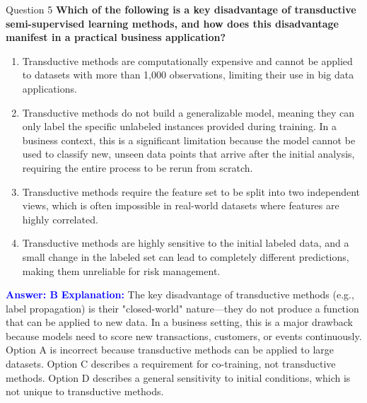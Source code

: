 \documentclass{beamer}
\begin{document}
	\begin{frame}{Question 5}
		\textbf{Which of the following is a key disadvantage of transductive semi-supervised learning methods, and how does this disadvantage manifest in a practical business application?}
		\begin{enumerate}
			\item Transductive methods are computationally expensive and cannot be applied to datasets with more than 1,000 observations, limiting their use in big data applications.
			\item Transductive methods do not build a generalizable model, meaning they can only label the specific unlabeled instances provided during training. In a business context, this is a significant limitation because the model cannot be used to classify new, unseen data points that arrive after the initial analysis, requiring the entire process to be rerun from scratch.
			\item Transductive methods require the feature set to be split into two independent views, which is often impossible in real-world datasets where features are highly correlated.
			\item Transductive methods are highly sensitive to the initial labeled data, and a small change in the labeled set can lead to completely different predictions, making them unreliable for risk management.
		\end{enumerate}
		\vspace{0.2cm}
		\textcolor{blue}{\textbf{Answer: B}}
		\vspace{0.2cm}
		\textcolor{blue}{\textbf{Explanation:}} The key disadvantage of transductive methods (e.g., label propagation) is their "closed-world" nature—they do not produce a function that can be applied to new data. In a business setting, this is a major drawback because models need to score new transactions, customers, or events continuously. Option A is incorrect because transductive methods can be applied to large datasets. Option C describes a requirement for co-training, not transductive methods. Option D describes a general sensitivity to initial conditions, which is not unique to transductive methods.
	\end{frame}
	
\end{document}
